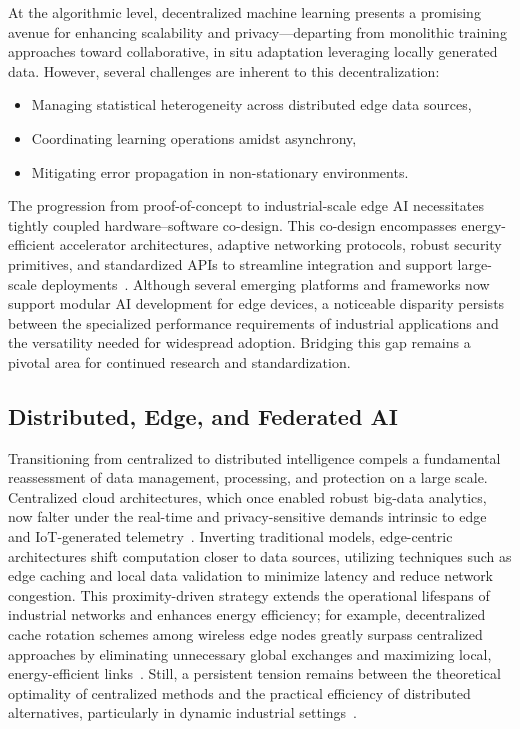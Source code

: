 At the algorithmic level, decentralized machine learning presents a promising avenue for enhancing scalability and privacy—departing from monolithic training approaches toward collaborative, in situ adaptation leveraging locally generated data. However, several challenges are inherent to this decentralization:
\begin{itemize}
    \item Managing statistical heterogeneity across distributed edge data sources,
    \item Coordinating learning operations amidst asynchrony,
    \item Mitigating error propagation in non-stationary environments.
\end{itemize}

The progression from proof-of-concept to industrial-scale edge AI necessitates tightly coupled hardware–software co-design. This co-design encompasses energy-efficient accelerator architectures, adaptive networking protocols, robust security primitives, and standardized APIs to streamline integration and support large-scale deployments~\cite{ref49}. Although several emerging platforms and frameworks now support modular AI development for edge devices, a noticeable disparity persists between the specialized performance requirements of industrial applications and the versatility needed for widespread adoption. Bridging this gap remains a pivotal area for continued research and standardization.

\subsection{Distributed, Edge, and Federated AI}

Transitioning from centralized to distributed intelligence compels a fundamental reassessment of data management, processing, and protection on a large scale. Centralized cloud architectures, which once enabled robust big-data analytics, now falter under the real-time and privacy-sensitive demands intrinsic to edge and IoT-generated telemetry~\cite{ref10,ref11}. Inverting traditional models, edge-centric architectures shift computation closer to data sources, utilizing techniques such as edge caching and local data validation to minimize latency and reduce network congestion. This proximity-driven strategy extends the operational lifespans of industrial networks and enhances energy efficiency; for example, decentralized cache rotation schemes among wireless edge nodes greatly surpass centralized approaches by eliminating unnecessary global exchanges and maximizing local, energy-efficient links~\cite{ref11}. Still, a persistent tension remains between the theoretical optimality of centralized methods and the practical efficiency of distributed alternatives, particularly in dynamic industrial settings~\cite{ref10,ref11}.

